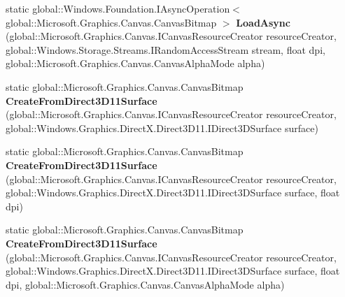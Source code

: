 \begin{DoxyCompactItemize}
\item 
\mbox{\label{class_microsoft_1_1_graphics_1_1_canvas_1_1_canvas_bitmap_a3f15d77e2e8485e54d0e45d2f972764d}} 
static global\+::\+Windows.\+Foundation.\+I\+Async\+Operation$<$ global\+::\+Microsoft.\+Graphics.\+Canvas.\+Canvas\+Bitmap $>$ {\bfseries Load\+Async} (global\+::\+Microsoft.\+Graphics.\+Canvas.\+I\+Canvas\+Resource\+Creator resource\+Creator, global\+::\+Windows.\+Storage.\+Streams.\+I\+Random\+Access\+Stream stream, float dpi, global\+::\+Microsoft.\+Graphics.\+Canvas.\+Canvas\+Alpha\+Mode alpha)
\item 
\mbox{\label{class_microsoft_1_1_graphics_1_1_canvas_1_1_canvas_bitmap_adb53e7172552d09bc317b5b85c254fff}} 
static global\+::\+Microsoft.\+Graphics.\+Canvas.\+Canvas\+Bitmap {\bfseries Create\+From\+Direct3\+D11\+Surface} (global\+::\+Microsoft.\+Graphics.\+Canvas.\+I\+Canvas\+Resource\+Creator resource\+Creator, global\+::\+Windows.\+Graphics.\+Direct\+X.\+Direct3\+D11.\+I\+Direct3\+D\+Surface surface)
\item 
\mbox{\label{class_microsoft_1_1_graphics_1_1_canvas_1_1_canvas_bitmap_a9bcb0865c8ef9a544991db05907b06ff}} 
static global\+::\+Microsoft.\+Graphics.\+Canvas.\+Canvas\+Bitmap {\bfseries Create\+From\+Direct3\+D11\+Surface} (global\+::\+Microsoft.\+Graphics.\+Canvas.\+I\+Canvas\+Resource\+Creator resource\+Creator, global\+::\+Windows.\+Graphics.\+Direct\+X.\+Direct3\+D11.\+I\+Direct3\+D\+Surface surface, float dpi)
\item 
\mbox{\label{class_microsoft_1_1_graphics_1_1_canvas_1_1_canvas_bitmap_af8889f744c558157dc904b1fd37e99a4}} 
static global\+::\+Microsoft.\+Graphics.\+Canvas.\+Canvas\+Bitmap {\bfseries Create\+From\+Direct3\+D11\+Surface} (global\+::\+Microsoft.\+Graphics.\+Canvas.\+I\+Canvas\+Resource\+Creator resource\+Creator, global\+::\+Windows.\+Graphics.\+Direct\+X.\+Direct3\+D11.\+I\+Direct3\+D\+Surface surface, float dpi, global\+::\+Microsoft.\+Graphics.\+Canvas.\+Canvas\+Alpha\+Mode alpha)
\item 
\mbox{\label{class_microsoft_1_1_graphics_1_1_canvas_1_1_canvas_bitmap_a0348f1385bf9b0fc99f3bd0a55c0ae0a}} 

\end{DoxyCompactItemize}
